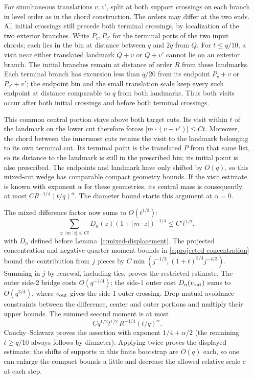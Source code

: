 \documentclass[11pt]{article}
\numberwithin{equation}{section}
\theoremstyle{definition}\newtheorem{definition}[theorem]{Definition}
\theoremstyle{remark}\newtheorem{remark}[theorem]{Remark}
\begin{document}
For simultaneous translations \(v,v'\), split at both support crossings
on each branch in level order as in the chord construction. The orders
may differ at the two ends. All initial crossings still precede both
terminal crossings, by localization of the two exterior branches.
Write \(P_v,P_{v'}\) for the terminal ports of the two input chords;
each lies in the bin at distance between \(q\) and \(2q\) from \(Q\).
For \(t\le q/10\), a visit near either translated landmark \(Q+v\) or
\(Q+v'\) cannot lie on an exterior branch. The initial branches remain
at distance of order \(R\) from these landmarks. Each terminal branch
has excursion less than \(q/20\) from its endpoint \(P_v+v\) or
\(P_{v'}+v'\);
the endpoint bin and the small translation scale keep every such
endpoint at distance comparable to \(q\) from both landmarks.
Thus both visits occur after both initial crossings and before both
terminal crossings.

This common central portion stays above both target cuts. Its visit
within \(t\) of the landmark on the lower cut therefore forces
\(|m\cdot(v-v')|\le Ct\). Moreover, the chord between the innermost
cuts retains the visit to the landmark belonging to its own terminal
cut. Its terminal point is the translated \(P\) from that same list,
so its distance to the landmark is still in the prescribed bin; its
initial point is also prescribed. The endpoints and landmark have
only shifted by \(O(q)\), so this mixed-cut wedge has comparable compact
geometry bounds. If the visit estimate is known with exponent
\(\alpha\) for these geometries, its central mass is consequently at
most \(CR^{-1/4}(t/q)^\alpha\). The diameter bound starts this argument
at \(\alpha=0\).



The mixed difference factor now sums to \(O(t^{1/2})\):
\[
 \sum_{z:\ |m\cdot z|\le C t}D_n(z)(1+|m\cdot z|)^{-1/4}\le C' t^{1/2},
\]
with \(D_n\) defined before Lemma~\ref{c:mixed-displacement}. The
projected concentration and negative-quarter-moment bounds in
\eqref{c:projected-concentration} bound the contribution from \(j\)
pieces by
\(C\min(j^{-1/3},(1+t)^{3/4}j^{-4/3})\).
Summing in \(j\) by renewal, including ties, proves the restricted
estimate. The outer side-2 bridge costs \(O(q^{-1/4})\); the side-1
outer cost \(D_n(v_{\rm out})\) sums to \(O(q^{3/4})\), where
\(v_{\rm out}\) gives the side-1 outer crossing. Drop mutual avoidance
constraints between the difference, center and outer portions and
multiply their upper bounds. The summed second moment is at most
\[
 C q^{1/2}t^{1/2}\,R^{-1/4}(t/q)^\alpha .
\]
Cauchy--Schwarz proves the assertion with exponent \(1/4+\alpha/2\) (the remaining \(t\ge q/10\) always follows by diameter). Applying twice proves the displayed estimate; the shifts of supports in this finite bootstrap are \(O(q)\) each, so one can enlarge the compact bounds a little and decrease the allowed relative scale \(c\) at each step.
\end{document}
